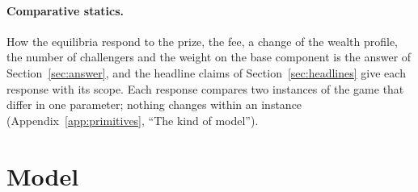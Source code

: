 \paragraph{Comparative statics.} How the equilibria respond to the prize, the
fee, a change of the wealth profile, the number of challengers and the weight on
the base component is the answer of Section~\ref{sec:answer}, and the headline claims of
Section~\ref{sec:headlines} give each response with its scope. Each response
compares two instances of the game that differ in one parameter; nothing
changes within an instance (Appendix~\ref{app:primitives}, ``The kind of
model'').

\section{Model}

